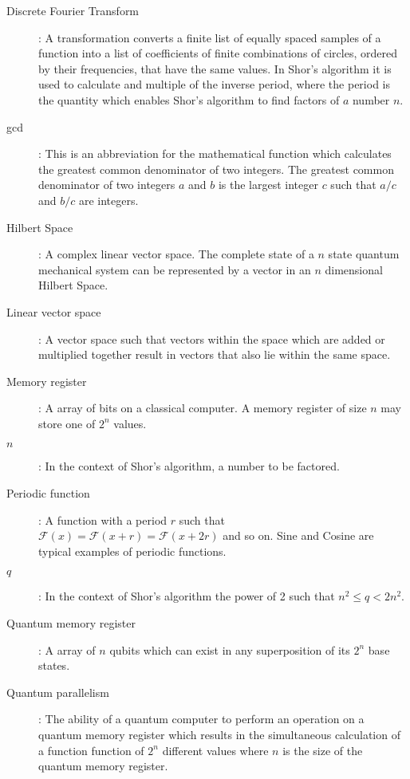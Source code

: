 \documentclass[]{article}
\begin{document}
\begin{description}
\item[Discrete Fourier Transform]:
         A transformation converts a finite list of equally spaced
         samples of a function into a list of coefficients of finite
         combinations of circles, ordered by their frequencies, that
         have the same values. In Shor's algorithm it is used to
         calculate and multiple of the inverse period, where the
         period is the quantity which enables Shor's algorithm to find
         factors of $a$ number $n$.

\item[gcd]:
	This is an abbreviation for the mathematical function which
calculates the greatest common denominator of two integers.  The
greatest common denominator of two integers $a$ and $b$ is the largest
integer $c$ such that $a / c$ and $b / c$ are integers.

\item[Hilbert Space]:
	A complex linear vector space.  The complete state of a $n$
state quantum mechanical system can be represented by a vector in an $n$
dimensional Hilbert Space.

\item[Linear vector space]:
	A vector space such that vectors within the space which are added or multiplied together result in vectors that also lie within the same space.

\item[Memory register]:
	A array of bits on a classical computer.  A memory register of
size $n$ may store one of $2^{n}$ values.

\item[$n$]:
	In the context of Shor's algorithm, a number to be factored.

\item[Periodic function]:
	A function with a period $r$ such that $\mathcal{F}(x) = \mathcal{F}(x + r) = \mathcal{F}(x + 2r)$ and so on. Sine and Cosine are typical examples of periodic functions.

\item[$q$]:
	In the context of Shor's algorithm the power of 2 such that
$n^{2} \leq q < 2n^{2}$.

\item[Quantum memory register]:
	A array of $n$ qubits which can exist in any superposition of
its $2^{n}$ base states.

\item[Quantum parallelism]:
	The ability of a quantum computer to perform an operation on a
quantum memory register which results in the simultaneous calculation
of a function function of $2^{n}$ different values where $n$ is the size of
the quantum memory register.


\end{description}
\end{document}

